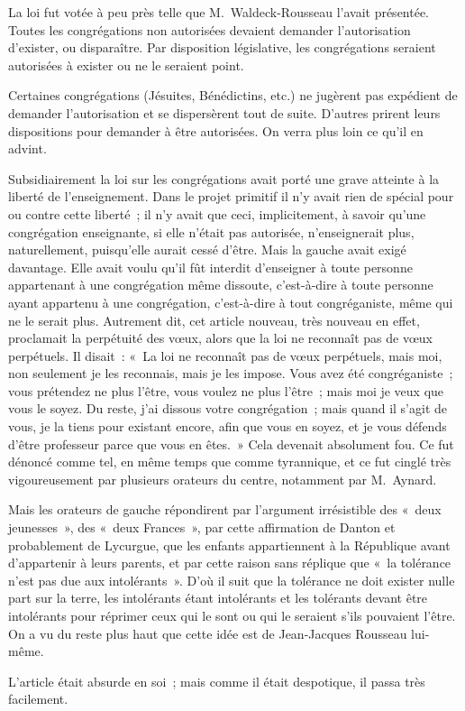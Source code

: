 \documentclass[french,twoside]{book} %
\begin{document}
La loi fut votée à peu près telle que M. Waldeck-Rousseau l’avait présentée. Toutes les congrégations non autorisées devaient demander l’autorisation d’exister, ou disparaître. Par disposition législative, les congrégations seraient autorisées à exister ou ne le seraient point.\par
Certaines congrégations (Jésuites, Bénédictins, etc.) ne jugèrent pas expédient de demander l’autorisation et se dispersèrent tout de suite. D’autres prirent leurs dispositions pour demander à être autorisées. On verra plus loin ce qu’il en advint.\par
Subsidiairement la loi sur les congrégations avait porté une grave atteinte à la liberté de l’enseignement.  Dans le projet primitif il n’y avait rien de spécial pour ou contre cette liberté ; il n’y avait que ceci, implicitement, à savoir qu’une congrégation enseignante, si elle n’était pas autorisée, n’enseignerait plus, naturellement, puisqu’elle aurait cessé d’être. Mais la gauche avait exigé davantage. Elle avait voulu qu’il fût interdit d’enseigner à toute personne appartenant à une congrégation même dissoute, c’est-à-dire à toute personne ayant appartenu à une congrégation, c’est-à-dire à tout congréganiste, même qui ne le serait plus. Autrement dit, cet article nouveau, très nouveau en effet, proclamait la perpétuité des vœux, alors que la loi ne reconnaît pas de vœux perpétuels. Il disait : « La loi ne reconnaît pas de vœux perpétuels, mais moi, non seulement je les reconnais, mais je les impose. Vous avez été congréganiste ; vous prétendez ne plus l’être, vous voulez ne plus l’être ; mais moi je veux que vous le soyez. Du reste, j’ai dissous votre congrégation ; mais quand il s’agit de vous, je la tiens pour existant encore, afin que vous en soyez, et je vous défends d’être professeur parce que vous en êtes. » Cela devenait absolument fou. Ce fut dénoncé comme tel, en même temps que comme tyrannique, et ce fut cinglé très vigoureusement par plusieurs orateurs  du centre, notamment par M. Aynard.\par
Mais les orateurs de gauche répondirent par l’argument irrésistible des « deux jeunesses », des « deux Frances », par cette affirmation de Danton et probablement de Lycurgue, que les enfants appartiennent à la République avant d’appartenir à leurs parents, et par cette raison sans réplique que « la tolérance n’est pas due aux intolérants ». D’où il suit que la tolérance ne doit exister nulle part sur la terre, les intolérants étant intolérants et les tolérants devant être intolérants pour réprimer ceux qui le sont ou qui le seraient s’ils pouvaient l’être. On a vu du reste plus haut que cette idée est de Jean-Jacques Rousseau lui-même.\par
L’article était absurde en soi ; mais comme il était despotique, il passa très facilement.\par
\end{document}
